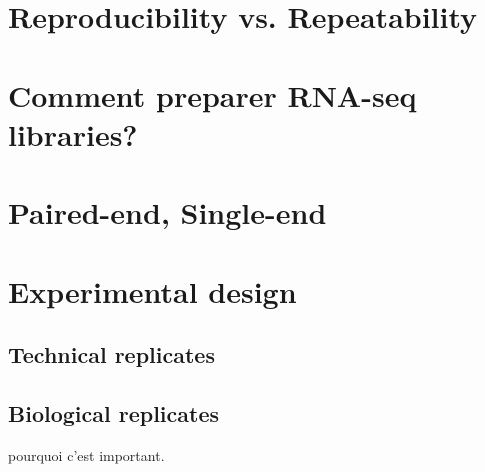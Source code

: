 \section{Reproducibility vs. Repeatability}

\section{Comment preparer RNA-seq libraries?}

\section{Paired-end, Single-end}

\section{Experimental design}
\subsection{Technical replicates}
\subsection{Biological replicates}
pourquoi c'est important.
